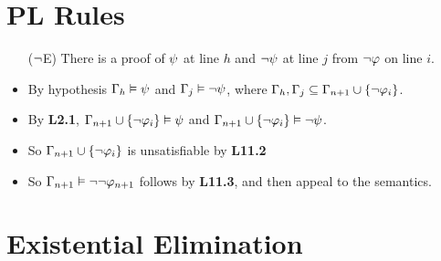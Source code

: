 \documentclass[a4paper, 11pt]{article} %
\begin{document}
\section*{PL Rules}

\begin{itemize}
  \item[($\neg$E)] There is a proof of $\psi$ at line $h$ and $\neg\psi$ at line $j$ from $\neg \varphi$ on line $i$.
    \item By hypothesis $\Gamma_h\vDash \psi$ and $\Gamma_j\vDash\neg\psi$, where $\Gamma_h,\Gamma_j\subseteq\Gamma_{n+1}\cup\lbrace\neg \varphi_i\rbrace$.
    \item By \textbf{L2.1}, $\Gamma_{n+1}\cup\lbrace\neg \varphi_i\rbrace\vDash\psi$ and $\Gamma_{n+1}\cup\lbrace\neg \varphi_i\rbrace\vDash\neg\psi$.
    \item So $\Gamma_{n+1}\cup\lbrace\neg \varphi_i\rbrace$ is unsatisfiable by \textbf{L11.2}
    \item So $\Gamma_{n+1}\vDash \neg\neg\varphi_{n+1}$ follows by \textbf{L11.3}, and then appeal to the semantics.
\end{itemize}





\section*{Existential Elimination}
\end{document}
